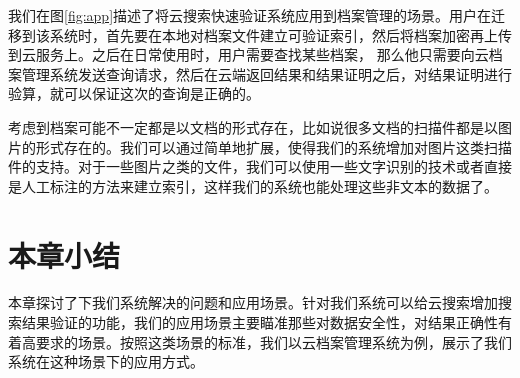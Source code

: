 我们在图\ref{fig:app}描述了将云搜索快速验证系统应用到档案管理的场景。用户在迁移到该系统时，首先要在本地对档案文件建立可验证索引，然后将档案加密再上传到云服务上。之后在日常使用时，用户需要查找某些档案，
那么他只需要向云档案管理系统发送查询请求，然后在云端返回结果和结果证明之后，对结果证明进行验算，就可以保证这次的查询是正确的。

考虑到档案可能不一定都是以文档的形式存在，比如说很多文档的扫描件都是以图片的形式存在的。我们可以通过简单地扩展，使得我们的系统增加对图片这类扫描件的支持。对于一些图片之类的文件，我们可以使用一些文字识别的技术或者直接是人工标注的方法来建立索引，这样我们的系统也能处理这些非文本的数据了。

\section{本章小结}
本章探讨了下我们系统解决的问题和应用场景。针对我们系统可以给云搜索增加搜索结果验证的功能，我们的应用场景主要瞄准那些对数据安全性，对结果正确性有着高要求的场景。按照这类场景的标准，我们以云档案管理系统为例，展示了我们系统在这种场景下的应用方式。
